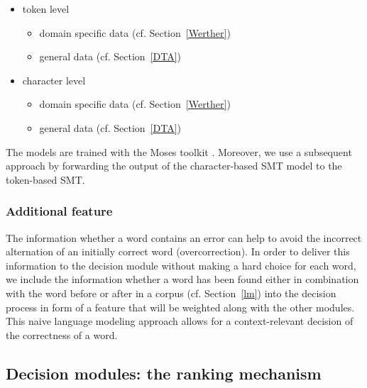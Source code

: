 \documentclass[11pt,letterpaper]{article}
\begin{document}
\begin{itemize} 
\setlength\itemsep{-0.3em}
\item token level
    \begin{itemize}
    \item domain specific data (cf. Section~\ref{Werther})
    \item general data (cf. Section~\ref{DTA})
    \end{itemize}
\item character level
    \begin{itemize}
    \item domain specific data (cf. Section~\ref{Werther})
    \item general data (cf. Section~\ref{DTA})
    \end{itemize}
\end{itemize}

\noindent
The models are trained with the Moses toolkit \cite{Koehn2007}.  Moreover, we use a subsequent approach by forwarding the output of the character-based SMT model to the token-based SMT.

\subsubsection{Additional feature}
The information whether a word contains an error can help to avoid the incorrect alternation of an initially correct word (overcorrection).
In order to deliver this information to the decision module without making a hard choice for each word,
 we include the information whether a word has been found either in combination with the word before or after in a corpus (cf. Section~\ref{lm}) into the decision process in form of a feature that will be weighted along with the other modules. This naive language modeling approach allows for a context-relevant decision of the correctness of a word.


\subsection{Decision modules: the ranking mechanism}
\end{document}
